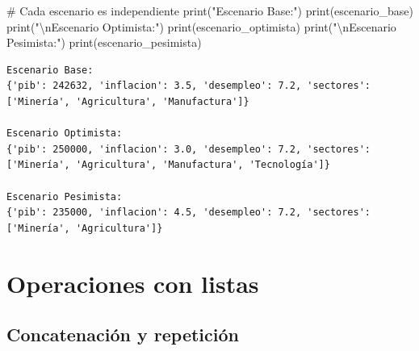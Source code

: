 \documentclass[
  doc,
  floatsintext,
  longtable,
  a4paper,
  nolmodern,
  notxfonts,
  notimes,
  12pt,
  colorlinks=true,linkcolor=blue,citecolor=blue,urlcolor=blue]{apa7}
\newenvironment{Shaded}{\begin{snugshade}}{\end{snugshade}}
\newcommand{\BuiltInTok}[1]{\textcolor[rgb]{0.00,0.23,0.31}{#1}}
\newcommand{\CharTok}[1]{\textcolor[rgb]{0.13,0.47,0.30}{#1}}
\newcommand{\CommentTok}[1]{\textcolor[rgb]{0.37,0.37,0.37}{#1}}
\newcommand{\NormalTok}[1]{\textcolor[rgb]{0.00,0.23,0.31}{#1}}
\newcommand{\StringTok}[1]{\textcolor[rgb]{0.13,0.47,0.30}{#1}}
\begin{document}
\begin{Shaded}
\begin{Highlighting}[]
\CommentTok{\# Cada escenario es independiente}
\BuiltInTok{print}\NormalTok{(}\StringTok{"Escenario Base:"}\NormalTok{)}
\BuiltInTok{print}\NormalTok{(escenario\_base)}
\BuiltInTok{print}\NormalTok{(}\StringTok{"}\CharTok{\textbackslash{}n}\StringTok{Escenario Optimista:"}\NormalTok{)}
\BuiltInTok{print}\NormalTok{(escenario\_optimista)}
\BuiltInTok{print}\NormalTok{(}\StringTok{"}\CharTok{\textbackslash{}n}\StringTok{Escenario Pesimista:"}\NormalTok{)}
\BuiltInTok{print}\NormalTok{(escenario\_pesimista)}
\end{Highlighting}
\end{Shaded}

\begin{verbatim}
Escenario Base:
{'pib': 242632, 'inflacion': 3.5, 'desempleo': 7.2, 'sectores': ['Minería', 'Agricultura', 'Manufactura']}

Escenario Optimista:
{'pib': 250000, 'inflacion': 3.0, 'desempleo': 7.2, 'sectores': ['Minería', 'Agricultura', 'Manufactura', 'Tecnología']}

Escenario Pesimista:
{'pib': 235000, 'inflacion': 4.5, 'desempleo': 7.2, 'sectores': ['Minería', 'Agricultura']}
\end{verbatim}

\section{Operaciones con listas}\label{operaciones-con-listas}

\subsection{Concatenación y
repetición}\label{concatenaciuxf3n-y-repeticiuxf3n}
\end{document}
